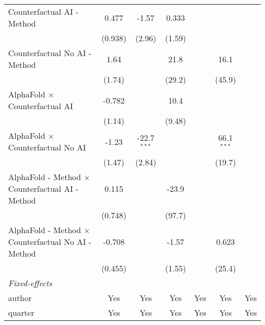 \begin{tabular}{lcccccc}
   Counterfactual AI - Method                                 & 0.477        & -1.57         & 0.333        &                &              &   \\   
                                                              & (0.938)      & (2.96)        & (1.59)       &                &              &   \\   
   Counterfactual No AI - Method                              & 1.64         &               & 21.8         &                & 16.1         &   \\   
                                                              & (1.74)       &               & (29.2)       &                & (45.9)       &   \\   
   AlphaFold $\times$ Counterfactual AI                       & -0.782       &               & 10.4         &                &              &   \\   
                                                              & (1.14)       &               & (9.48)       &                &              &   \\   
   AlphaFold $\times$ Counterfactual No AI                    & -1.23        & -22.7$^{***}$ &              &                & 66.1$^{***}$ &   \\   
                                                              & (1.47)       & (2.84)        &              &                & (19.7)       &   \\   
   AlphaFold - Method $\times$ Counterfactual AI - Method     & 0.115        &               & -23.9        &                &              &   \\   
                                                              & (0.748)      &               & (97.7)       &                &              &   \\   
   AlphaFold - Method $\times$ Counterfactual No AI - Method  & -0.708       &               & -1.57        &                & 0.623        &   \\   
                                                              & (0.455)      &               & (1.55)       &                & (25.4)       &   \\   
   \midrule
   \emph{Fixed-effects}\\
   author                                                     & Yes          & Yes           & Yes          & Yes            & Yes          & Yes\\  
   quarter                                                    & Yes          & Yes           & Yes          & Yes            & Yes          & Yes\\  

\end{tabular}
